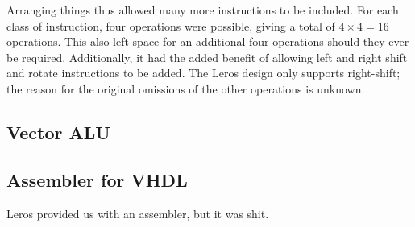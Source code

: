 Arranging things thus allowed many more instructions to be included. For each
class of instruction, four operations were possible, giving a total of $4 \times
4 = 16$ operations. This also left space for an additional four operations
should they ever be required. Additionally, it  had the added benefit of
allowing left and right shift and rotate instructions to be added. The Leros
design only supports right-shift; the reason for the original omissions of the other
operations is unknown.



\subsection{Vector ALU}
\subsection{Assembler for VHDL}

  Leros provided us with an assembler, but it was shit.
